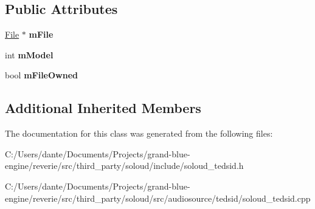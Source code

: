 \subsection*{Public Attributes}
\begin{DoxyCompactItemize}
\item 
\mbox{\label{class_so_loud_1_1_ted_sid_af02ef0eb966676b1978e701e0289bdd6}} 
\mbox{\hyperlink{class_so_loud_1_1_file}{File}} $\ast$ {\bfseries m\+File}
\item 
\mbox{\label{class_so_loud_1_1_ted_sid_a4a0103540e6e109e2373cf02822187cc}} 
int {\bfseries m\+Model}
\item 
\mbox{\label{class_so_loud_1_1_ted_sid_a9fdc31b3baa994d61c4886c76cd92cf8}} 
bool {\bfseries m\+File\+Owned}
\end{DoxyCompactItemize}
\subsection*{Additional Inherited Members}


The documentation for this class was generated from the following files\+:\begin{DoxyCompactItemize}
\item 
C\+:/\+Users/dante/\+Documents/\+Projects/grand-\/blue-\/engine/reverie/src/third\+\_\+party/soloud/include/soloud\+\_\+tedsid.\+h\item 
C\+:/\+Users/dante/\+Documents/\+Projects/grand-\/blue-\/engine/reverie/src/third\+\_\+party/soloud/src/audiosource/tedsid/soloud\+\_\+tedsid.\+cpp\end{DoxyCompactItemize}

